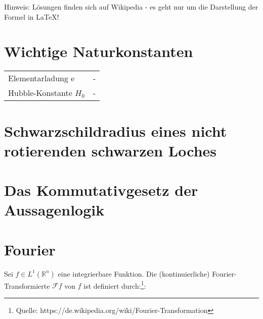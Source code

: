 \documentclass[a4paper,10pt]{article}
\begin{document}
Hinweis: Lösungen finden sich auf Wikipedia - es geht nur um die Darstellung der Formel in LaTeX!
\section{Wichtige Naturkonstanten}
\begin{center}
\begin{tabular}{ll}
Elementarladung e & -  \\
Hubble-Konstante $H_0$  & - 
\end{tabular}
\end{center}

\section{Schwarzschildradius eines nicht rotierenden schwarzen Loches}

\section{Das Kommutativgesetz der Aussagenlogik}


\section{Fourier}
Sei $f\in L^{1}(\mathbb{R}^{n})$ eine integrierbare Funktion. Die (kontinuierliche) Fourier-Transformierte $\mathcal{F}f$ von $f$ ist definiert durch:\footnote{Quelle: https://de.wikipedia.org/wiki/Fourier-Transformation}:
\end{document}
